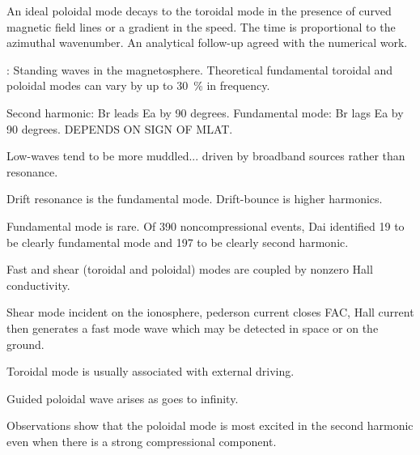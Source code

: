 An ideal poloidal mode decays to the toroidal mode in the presence of curved magnetic field lines\cite{radoski_1974} or a gradient in the \Alfven speed\cite{mann_1995}. The time is proportional to the azimuthal wavenumber\cite{mann_1995}. An analytical follow-up agreed with the numerical work\cite{mann_1997}. 


\cite{cummings_1969}: Standing \Alfven waves in the magnetosphere. Theoretical fundamental toroidal and poloidal modes can vary by up to \SI{30}{\percent} in frequency. 

Second harmonic: Br leads Ea by 90 degrees. Fundamental mode: Br lags Ea by 90 degrees. DEPENDS ON SIGN OF MLAT. \cite{dai_2015}

Low-\azm waves tend to be more muddled... driven by broadband sources rather than resonance\cite{dai_2015}. 

Drift resonance is the fundamental mode. Drift-bounce is higher harmonics\cite{dai_2015}. 


Fundamental mode is rare. Of 390 noncompressional events, Dai identified 19 to be clearly fundamental mode and 197 to be clearly second harmonic\cite{dai_2015}. 

Fast and shear (toroidal and poloidal) modes are coupled by nonzero Hall conductivity\cite{kato_1956}. 

Shear mode incident on the ionosphere, pederson current closes FAC, Hall current then generates a fast mode wave which may be detected in space or on the ground\cite{tamao_1965}. 

Toroidal mode is usually associated with external driving\cite{chen_1974,southwood_1974}. 

Guided poloidal wave arises as \azm goes to infinity\cite{radoski_1967_poloidal}. 

Observations show that the poloidal mode is most excited in the second harmonic\cite{cummings_1969,hughes_1978,arthur_1981,singer_1982,takahashi_1984,engebretson_1988} even when there is a strong compressional component\cite{takahashi_1987,haerendel_1999,vaivads_2001,sibeck_2012}. 

